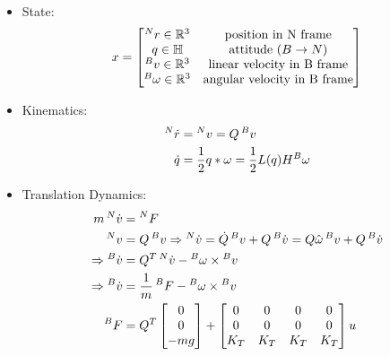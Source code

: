 \begin{itemize}
    \item State:
    \begin{align}
        x = 
        \begin{bmatrix}
            \prescript{N}{}{r} \in \mathbb{R}^3 & \text{position in N frame} \\
            q \in \mathbb{H} & \text{attitude } (B \to N)\\
            \prescript{B}{}{v} \in \mathbb{R}^3 & \text{linear velocity in B frame} \\
            \prescript{B}{}{\omega} \in \mathbb{R}^3 & \text{angular velocity in B frame} \\
        \end{bmatrix}
    \end{align}
    \item Kinematics:
    \begin{align}
        \prescript{N}{}{\dot r} & = \prescript{N}{}{v} = Q \prescript{B}{}{v} \\
        \dot q & = \frac{1}{2}q * \omega = \frac{1}{2} L(q) H ^B \omega
    \end{align}
    \item Translation Dynamics:
    \begin{align}
        m \prescript{N}{}{\dot v} & = \prescript{N}{}{F} \\
        \prescript{N}{}{v} & = Q \prescript{B}{}{v} \Rightarrow \prescript{N}{}{\dot v} = \dot Q \prescript{B}{}{v} + Q \prescript{B}{}{\dot v} = Q \hat \omega \prescript{B}{}{v} + Q \prescript{B}{}{\dot v} \\
        \Rightarrow \prescript{B}{}{\dot v} & = Q^T \prescript{N}{}{\dot v} - \prescript{B}{}{\omega} \times \prescript{B}{}{v} \\
        \Rightarrow \prescript{B}{}{\dot v} & = \frac{1}{m} \prescript{B}{}{F} - \prescript{B}{}{\omega} \times \prescript{B}{}{v} \\
        \prescript{B}{}{F} & = Q^T 
        \begin{bmatrix}
            0 \\ 0 \\ -mg
        \end{bmatrix} + 
        \begin{bmatrix}
            0 & 0 & 0 & 0 \\
            0 & 0 & 0 & 0 \\
            K_T & K_T & K_T & K_T
        \end{bmatrix} u

\end{align}
\end{itemize}
